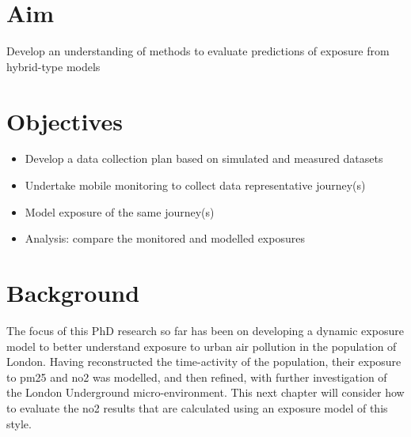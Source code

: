 \section{Aim}
\label{sec:4aim}

Develop an understanding of methods to evaluate predictions of exposure from hybrid-type models

\section{Objectives}
\label{sec:4objectives}

\begin{itemize}
    \item Develop a data collection plan based on simulated and measured datasets
    \item Undertake mobile monitoring to collect data representative journey(s)
    \item Model exposure of the same journey(s)
    \item Analysis: compare the monitored and modelled exposures
\end{itemize}

\section{Background}
\label{sec:4background}

The focus of this PhD research so far has been on developing a dynamic exposure model to better understand exposure to urban air pollution in the population of London. Having reconstructed the time-activity of the population, their exposure to \gls{pm25} and \gls{no2} was modelled, and then refined, with further investigation of the London Underground micro-environment. This next chapter will consider how to evaluate the \gls{no2} results that are calculated using an exposure model of this style.

